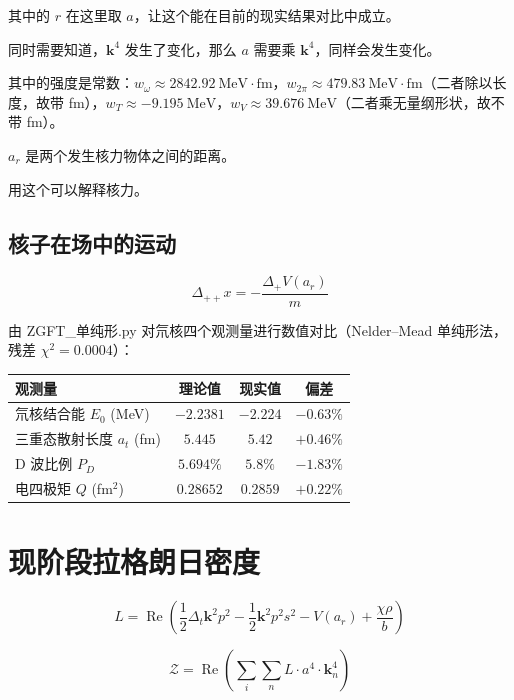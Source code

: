 \documentclass[UTF8]{ctexart}
\begin{document}
其中的 \(r\) 在这里取 \(a\)，让这个能在目前的现实结果对比中成立。

同时需要知道，\(\mathbf{k}^4\) 发生了变化，那么 \(a\) 需要乘 \(\mathbf{k}^4\)，同样会发生变化。

其中的强度是常数：\(w_{\omega}\approx 2842.92\ \mathrm{MeV\cdot fm}\)，\(w_{2\pi}\approx 479.83\ \mathrm{MeV\cdot fm}\)（二者除以长度，故带 fm），\(w_T\approx -9.195\ \mathrm{MeV}\)，\(w_V\approx 39.676\ \mathrm{MeV}\)（二者乘无量纲形状，故不带 fm）。

\(a_r\) 是两个发生核力物体之间的距离。

用这个可以解释核力。


\subsection{核子在场中的运动}

\begin{equation}
\Delta_{++}x=-\frac{\Delta_+V(a_r)}{m}
\end{equation}


由 ZGFT\_单纯形.py 对氘核四个观测量进行数值对比（Nelder--Mead 单纯形法，残差 $\chi^2=0.0004$）：

\begin{center}
\begin{tabular}{lccc}
\hline
观测量 & 理论值 & 现实值 & 偏差 \\
\hline
氘核结合能 $E_0$ (MeV) & $-2.2381$ & $-2.224$ & $-0.63\%$ \\
三重态散射长度 $a_t$ (fm) & $5.445$ & $5.42$ & $+0.46\%$ \\
D 波比例 $P_D$ & $5.694\%$ & $5.8\%$ & $-1.83\%$ \\
电四极矩 $Q$ (fm$^2$) & $0.28652$ & $0.2859$ & $+0.22\%$ \\
\hline
\end{tabular}
\end{center}

\section{现阶段拉格朗日密度}

\begin{equation}
L=\operatorname{Re}\left(\frac{1}{2}\Delta_t\mathbf{k}^2p^2-\frac{1}{2}\mathbf{k}^2p^2s^2-V(a_r)+\frac{\chi\rho}{b}\right)
\end{equation}

\begin{equation}
\mathcal{Z}=\operatorname{Re}\left(\sum_i\sum_n L\cdot a^4\cdot\mathbf{k}^4_n\right)
\end{equation}
\end{document}
